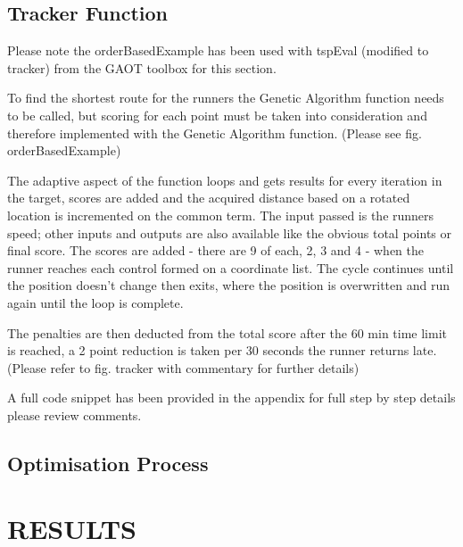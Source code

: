 \documentclass[a4paper, 10pt]{IEEEconf}
\begin{document}

\subsection{Tracker Function}

Please note the orderBasedExample has been used with tspEval (modified to tracker) from the GAOT toolbox for this section.

To find the shortest route for the runners the Genetic Algorithm function needs to be called, but scoring for each point must be taken into consideration and therefore implemented with the Genetic Algorithm function. (Please see fig. orderBasedExample)

The adaptive aspect of the function loops and gets results for every iteration in the target, scores are added and the acquired distance based on a rotated location is incremented on the common term. The input passed is the runners speed; other inputs and outputs are also available like the obvious total points or final score. The scores are added - there are 9 of each, 2, 3 and 4 - when the runner reaches each control formed on a coordinate list. The cycle continues until the position doesn't change then exits, where the position is overwritten and run again until the loop is complete.

The penalties are then deducted from the total score after the 60 min time limit is reached, a 2 point reduction is taken per 30 seconds the runner returns late. (Please refer to fig. tracker with commentary for further details)

A full code snippet has been provided in the appendix for full step by step details please review comments.

\clearpage
\subsection{Optimisation Process}

\clearpage
\section{RESULTS}


\end{document}
